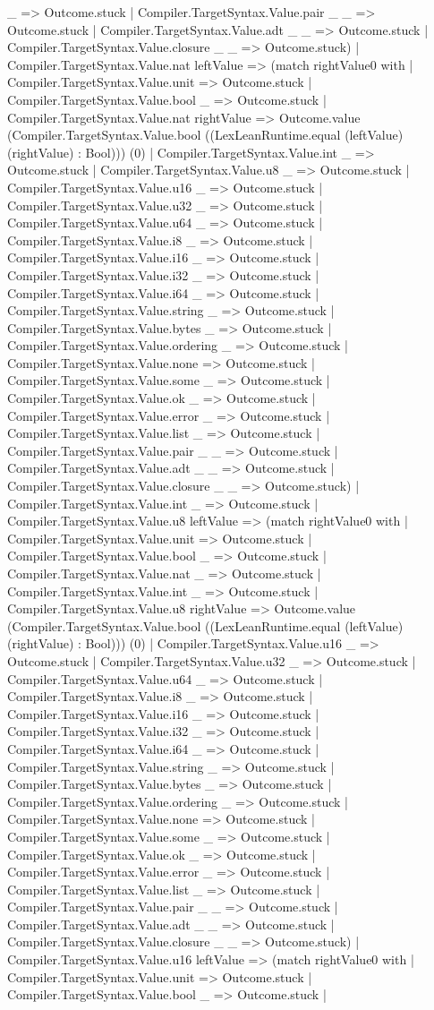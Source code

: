 \documentclass[11pt]{article}
\begin{document}
\_ => Outcome.stuck | Compiler.TargetSyntax.Value.pair \_ \_ => Outcome.stuck | Compiler.TargetSyntax.Value.adt \_ \_ => Outcome.stuck | Compiler.TargetSyntax.Value.closure \_ \_ => Outcome.stuck) | Compiler.TargetSyntax.Value.nat leftValue => (match rightValue0 with | Compiler.TargetSyntax.Value.unit => Outcome.stuck | Compiler.TargetSyntax.Value.bool \_ => Outcome.stuck | Compiler.TargetSyntax.Value.nat rightValue => Outcome.value (Compiler.TargetSyntax.Value.bool ((LexLeanRuntime.equal (leftValue) (rightValue) : Bool))) (0) | Compiler.TargetSyntax.Value.int \_ => Outcome.stuck | Compiler.TargetSyntax.Value.u8 \_ => Outcome.stuck | Compiler.TargetSyntax.Value.u16 \_ => Outcome.stuck | Compiler.TargetSyntax.Value.u32 \_ => Outcome.stuck | Compiler.TargetSyntax.Value.u64 \_ => Outcome.stuck | Compiler.TargetSyntax.Value.i8 \_ => Outcome.stuck | Compiler.TargetSyntax.Value.i16 \_ => Outcome.stuck | Compiler.TargetSyntax.Value.i32 \_ => Outcome.stuck | Compiler.TargetSyntax.Value.i64 \_ => Outcome.stuck | Compiler.TargetSyntax.Value.string \_ => Outcome.stuck | Compiler.TargetSyntax.Value.bytes \_ => Outcome.stuck | Compiler.TargetSyntax.Value.ordering \_ => Outcome.stuck | Compiler.TargetSyntax.Value.none => Outcome.stuck | Compiler.TargetSyntax.Value.some \_ => Outcome.stuck | Compiler.TargetSyntax.Value.ok \_ => Outcome.stuck | Compiler.TargetSyntax.Value.error \_ => Outcome.stuck | Compiler.TargetSyntax.Value.list \_ => Outcome.stuck | Compiler.TargetSyntax.Value.pair \_ \_ => Outcome.stuck | Compiler.TargetSyntax.Value.adt \_ \_ => Outcome.stuck | Compiler.TargetSyntax.Value.closure \_ \_ => Outcome.stuck) | Compiler.TargetSyntax.Value.int \_ => Outcome.stuck | Compiler.TargetSyntax.Value.u8 leftValue => (match rightValue0 with | Compiler.TargetSyntax.Value.unit => Outcome.stuck | Compiler.TargetSyntax.Value.bool \_ => Outcome.stuck | Compiler.TargetSyntax.Value.nat \_ => Outcome.stuck | Compiler.TargetSyntax.Value.int \_ => Outcome.stuck | Compiler.TargetSyntax.Value.u8 rightValue => Outcome.value (Compiler.TargetSyntax.Value.bool ((LexLeanRuntime.equal (leftValue) (rightValue) : Bool))) (0) | Compiler.TargetSyntax.Value.u16 \_ => Outcome.stuck | Compiler.TargetSyntax.Value.u32 \_ => Outcome.stuck | Compiler.TargetSyntax.Value.u64 \_ => Outcome.stuck | Compiler.TargetSyntax.Value.i8 \_ => Outcome.stuck | Compiler.TargetSyntax.Value.i16 \_ => Outcome.stuck | Compiler.TargetSyntax.Value.i32 \_ => Outcome.stuck | Compiler.TargetSyntax.Value.i64 \_ => Outcome.stuck | Compiler.TargetSyntax.Value.string \_ => Outcome.stuck | Compiler.TargetSyntax.Value.bytes \_ => Outcome.stuck | Compiler.TargetSyntax.Value.ordering \_ => Outcome.stuck | Compiler.TargetSyntax.Value.none => Outcome.stuck | Compiler.TargetSyntax.Value.some \_ => Outcome.stuck | Compiler.TargetSyntax.Value.ok \_ => Outcome.stuck | Compiler.TargetSyntax.Value.error \_ => Outcome.stuck | Compiler.TargetSyntax.Value.list \_ => Outcome.stuck | Compiler.TargetSyntax.Value.pair \_ \_ => Outcome.stuck | Compiler.TargetSyntax.Value.adt \_ \_ => Outcome.stuck | Compiler.TargetSyntax.Value.closure \_ \_ => Outcome.stuck) | Compiler.TargetSyntax.Value.u16 leftValue => (match rightValue0 with | Compiler.TargetSyntax.Value.unit => Outcome.stuck | Compiler.TargetSyntax.Value.bool \_ => Outcome.stuck | 
\end{document}
